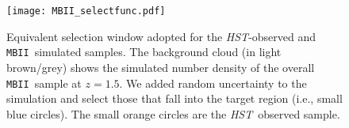 \documentclass[twocolumn,trackchanges]{aastex63}
\newcommand{\hst}{{\it HST}}
\newcommand{\mbh}{$\mathcal M_{\rm BH}$}
\newcommand{\mstar}{{$M_*$}}
\newcommand{\mbii}{\texttt{MBII}}
\begin{document}

\begin{figure}[t]
\texttt{[image: MBII\_selectfunc.pdf]}
\caption{Equivalent selection window adopted for the \hst-observed and  \mbii\ simulated samples. The background cloud (in light brown/grey) shows the simulated number density of the overall \mbii\ sample at $z=1.5$. We added random uncertainty to the simulation and select those that fall into the target region (i.e., small blue circles). The small orange circles are the \hst\ observed sample.}
\label{fig:selectfunc}
\end{figure}
\end{document}
